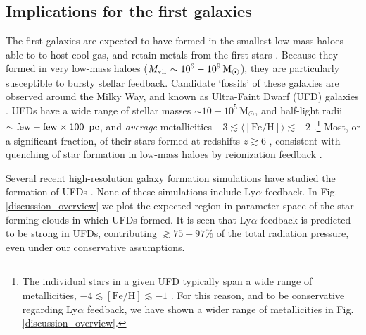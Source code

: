 \documentclass[fleqn,usenatbib]{mnras}
\newcommand\Msun{\text{M}_{\astrosun}} %
\begin{document}
\subsection{Implications for the first galaxies}
\label{first galaxies implications}

The first galaxies are expected to have formed in the smallest low-mass haloes able to to host cool gas, and retain metals from the first stars \citep[e.g.][]{ Nebrin2023cooling}. Because they formed in very low-mass haloes ($M_{\rm vir} \sim 10^6 - 10^9 \, \Msun$), they are particularly susceptible to bursty stellar feedback. Candidate `fossils' of these galaxies are observed around the Milky Way, and known as Ultra-Faint Dwarf (UFD) galaxies \citep{Simon2019}. UFDs have a wide range of stellar masses $\sim 10 - 10^5 \, \Msun$, and half-light radii $\sim \textrm{few} - \textrm{few} \times 100 ~ \, \rm pc$, and \textit{average} metallicities $-3 \lesssim \langle [\textrm{Fe/H}] \rangle \lesssim -2$ \citep[e.g.][]{Simon2019, Fu2023_UFD, Smith2024_UFD}.\footnote{The individual stars in a given UFD typically span a wide range of metallicities, $-4 \lesssim [\textrm{Fe/H}] \lesssim -1$ \citep[e.g.][]{Fu2023_UFD}. For this reason, and to be conservative regarding Ly$\alpha$ feedback, we have shown a wider range of metallicities in Fig. \ref{discussion_overview}. } Most, or a significant fraction, of their stars formed at redshifts $z \gtrsim 6$ \citep[e.g.][]{Brown2014, Simon2021, McQuinn2024}, consistent with quenching of star formation in low-mass haloes by reionization feedback \citep[e.g.][]{Ricotti2005, Jeon2017, Wheeler2019, Benitez2020, Nebrin2023cooling}. 

Several recent high-resolution galaxy formation simulations have studied the formation of UFDs \citep{Ricotti2016, Jeon2017, Wheeler2019, Agertz2020, Applebaum2021, Gutcke2022}. None of these simulations include Ly$\alpha$ feedback. In Fig. \ref{discussion_overview} we plot the expected region in parameter space of the star-forming clouds in which UFDs formed. It is seen that Ly$\alpha$ feedback is predicted to be strong in UFDs, contributing $\gtrsim 75-97\%$ of the total radiation pressure, even under our conservative assumptions. 
\end{document}
